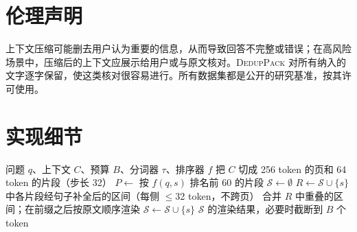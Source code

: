 \documentclass[11pt]{article}
\newcommand{\spk}{\textsc{DedupPack}}
\begin{document}
\section*{伦理声明}
上下文压缩可能删去用户认为重要的信息，从而导致回答不完整或错误；在高风险场景中，压缩后的上下文应展示给用户或与原文核对。\spk{} 对所有纳入的文字逐字保留，使这类核对很容易进行。所有数据集都是公开的研究基准，按其许可使用。



\appendix

\section{实现细节}
\label{app:impl}

\begin{algorithm}[h]
\caption{\spk{}}
\label{alg:sp}
\small
\begin{algorithmic}[1]
\Require 问题 $q$、上下文 $C$、预算 $B$、分词器 $\tau$、排序器 $f$
\State 把 $C$ 切成 256 token 的页和 64 token 的片段（步长 32）
\State $P\gets$ 按 $f(q,s)$ 排名前 60 的片段
\State $\mathcal S\gets\emptyset$
  \State $R\gets\mathcal S\cup\{s\}$ 中各片段经句子补全后的区间（每侧 $\le$32 token，不跨页）
  \State 合并 $R$ 中重叠的区间；在前缀之后按原文顺序渲染
   $\mathcal S\gets\mathcal S\cup\{s\}$ \EndIf
\EndFor
\State \Return $\mathcal S$ 的渲染结果，必要时截断到 $B$ 个 token
\end{algorithmic}
\end{algorithm}

\begin{table}[h]
\centering
\small
{}
\caption{实现常数（全部在测试前冻结）。}
\label{tab:impl}
\end{table}
\end{document}
